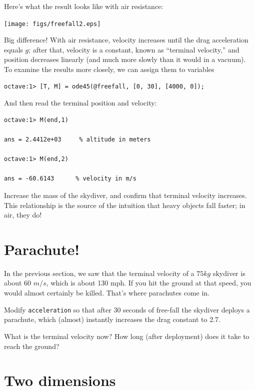 \documentclass{book}
\begin{document}
Here's what the result looks like with air resistance:

\beforefig \centerline{\texttt{[image: figs/freefall2.eps]}}

Big difference! With air resistance, velocity increases until
the drag acceleration equals $g$; after that, velocity is a constant,
known as ``terminal velocity,'' and position decreases linearly
(and much more slowly than it would in a vacuum). To examine
the results more closely, we can assign them to variables


\begin{verbatim}
octave:1> [T, M] = ode45(@freefall, [0, 30], [4000, 0]);
\end{verbatim}

And then read the terminal position and velocity:

\begin{verbatim}
octave:1> M(end,1)

ans = 2.4412e+03     % altitude in meters

octave:1> M(end,2)

ans = -60.6143      % velocity in m/s
\end{verbatim}

\begin{ex}
Increase the mass of the skydiver, and confirm that
terminal velocity increases. This relationship is the source of the
intuition that heavy objects fall faster; in air, they do!
\end{ex}


\section{Parachute!}

In the previous section, we saw that the terminal velocity of a $75
kg$ skydiver is about 60 $m/s$, which is about 130 mph. If you hit
the ground at that speed, you would almost certainly be killed.
That's where parachutes come in.

\begin{ex}
Modify {\tt acceleration} so that after 30 seconds of
free-fall the skydiver deploys a parachute, which (almost) instantly
increases the drag constant to 2.7.

What is the terminal velocity now? How long (after deployment) does
it take to reach the ground?
\end{ex}


\section{Two dimensions}
\label{projectile}
\end{document}
